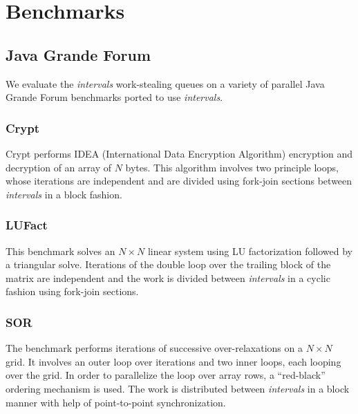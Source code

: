 
\chapter{Benchmarks}
\label{chap:appendix-benchmarks}

\section{Java Grande Forum}
\label{sec:benchmarks-jgf}

We evaluate the \emph{intervals} work-stealing queues on a variety of
parallel Java Grande Forum benchmarks \cite{Smith2001}
\cite{Mathew1999} \cite{Gregg2003} ported to use \emph{intervals}.

\subsection*{Crypt}

Crypt performs IDEA (International Data Encryption Algorithm)
encryption and decryption of an array of $N$ bytes. This algorithm
involves two principle loops, whose iterations are independent and are
divided using fork-join sections between \emph{intervals} in a block fashion.

\subsection*{LUFact}

This benchmark solves an $N \times N$ linear system using LU factorization
followed by a triangular solve. Iterations of the double loop over the
trailing block of the matrix are independent and the work is divided
between \emph{intervals} in a cyclic fashion using fork-join sections.

\subsection*{SOR}

The benchmark performs iterations of successive over-relaxations on a
$N \times N$ grid. It involves an outer loop over iterations and two
inner loops, each looping over the grid. In order to parallelize the
loop over array rows, a ``red-black'' ordering mechanism is used. The
work is distributed between \emph{intervals} in a block manner with
help of point-to-point synchronization.

